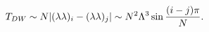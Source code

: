 \begin{equation}
T_{DW}\sim N|(\lambda\lambda)_i-(\lambda\lambda)_j|\sim N^2\Lambda^3 
\sin{{(i-j)\pi \over N}}.
\end{equation}

